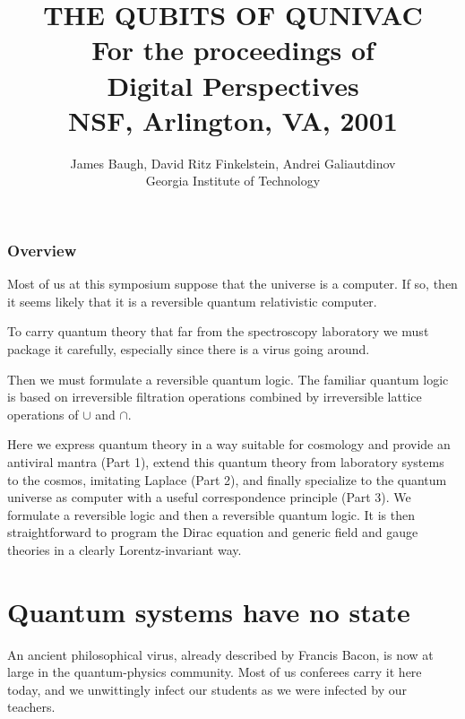 \documentclass[a4paper,11pt]{article}
\title{{\Huge \bf THE QUBITS OF QUNIVAC}\\
{\large For the proceedings of}\\
Digital Perspectives\\
{\large NSF, Arlington, VA, 2001}
}
\author {James Baugh,
David Ritz Finkelstein, Andrei Galiautdinov\\
Georgia Institute of Technology}
\begin{document}
\maketitle


\section{Overview}

Most of us at this symposium suppose 
that the universe is a computer.
If so,
then it seems likely that it is
a reversible quantum relativistic computer.

To carry quantum theory
that far from 
the spectroscopy laboratory
we must 
package it carefully,
especially since 
there is a virus
going around.

Then we must formulate a reversible quantum logic.
The familiar quantum logic is based on irreversible
filtration operations
combined by irreversible lattice operations
of $\cup$ and $\cap$.

Here
we express quantum theory in a 
way suitable for cosmology
and provide
an antiviral mantra (Part 1),
extend this quantum theory 
from laboratory systems to the cosmos,
imitating Laplace (Part 2),
and finally specialize to the quantum universe as
computer
with a useful correspondence principle (Part 3).
We formulate a reversible logic
and then a reversible quantum logic.
It is then straightforward to
program the Dirac equation and 
generic field
and gauge theories
in a clearly Lorentz-invariant way.


\part{\Huge Quantum systems have no state}

An ancient philosophical virus, 
already described by Francis Bacon,
is now at large in the quantum-physics community.
Most of us conferees carry it here today,
and we unwittingly 
infect our students as we were infected by our teachers.
\end{document}
